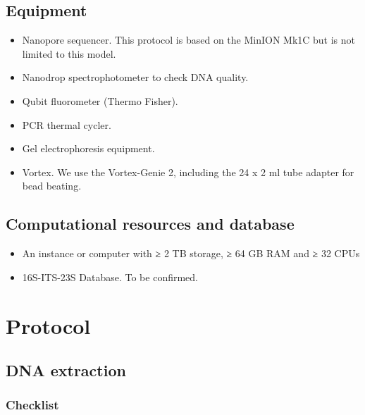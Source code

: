 \documentclass[
]{book}
\providecommand{\tightlist}{%
  \setlength{\itemsep}{0pt}\setlength{\parskip}{0pt}}
\begin{document}
\section{Equipment}\label{equipment}

\begin{itemize}
\tightlist
\item
  Nanopore sequencer. This protocol is based on the MinION Mk1C but is not limited to this model.
\item
  Nanodrop spectrophotometer to check DNA quality.
\item
  Qubit fluorometer (Thermo Fisher).
\item
  PCR thermal cycler.
\item
  Gel electrophoresis equipment.
\item
  Vortex. We use the Vortex-Genie 2, including the 24 x 2 ml tube adapter for bead beating.
\end{itemize}

\section{Computational resources and database}\label{computational-resources-and-database}

\begin{itemize}
\tightlist
\item
  An instance or computer with ≥ 2 TB storage, ≥ 64 GB RAM and ≥ 32 CPUs
\item
  16S-ITS-23S Database. To be confirmed.
\end{itemize}

\chapter{Protocol}\label{protocol}

\section{DNA extraction}\label{dna-extraction}

\subsection{Checklist}\label{checklist}
\end{document}
